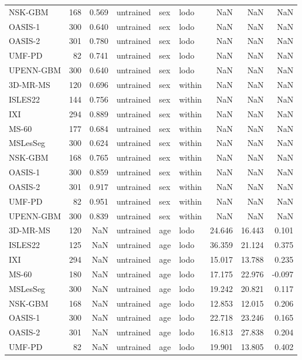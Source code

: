 \begin{tabular}{lrrlllrrr}
NSK-GBM & 168 & 0.569 & untrained & sex & lodo & NaN & NaN & NaN \\
OASIS-1 & 300 & 0.640 & untrained & sex & lodo & NaN & NaN & NaN \\
OASIS-2 & 301 & 0.780 & untrained & sex & lodo & NaN & NaN & NaN \\
UMF-PD & 82 & 0.741 & untrained & sex & lodo & NaN & NaN & NaN \\
UPENN-GBM & 300 & 0.640 & untrained & sex & lodo & NaN & NaN & NaN \\
3D-MR-MS & 120 & 0.696 & untrained & sex & within & NaN & NaN & NaN \\
ISLES22 & 144 & 0.756 & untrained & sex & within & NaN & NaN & NaN \\
IXI & 294 & 0.889 & untrained & sex & within & NaN & NaN & NaN \\
MS-60 & 177 & 0.684 & untrained & sex & within & NaN & NaN & NaN \\
MSLesSeg & 300 & 0.624 & untrained & sex & within & NaN & NaN & NaN \\
NSK-GBM & 168 & 0.765 & untrained & sex & within & NaN & NaN & NaN \\
OASIS-1 & 300 & 0.859 & untrained & sex & within & NaN & NaN & NaN \\
OASIS-2 & 301 & 0.917 & untrained & sex & within & NaN & NaN & NaN \\
UMF-PD & 82 & 0.951 & untrained & sex & within & NaN & NaN & NaN \\
UPENN-GBM & 300 & 0.839 & untrained & sex & within & NaN & NaN & NaN \\
3D-MR-MS & 120 & NaN & untrained & age & lodo & 24.646 & 16.443 & 0.101 \\
ISLES22 & 125 & NaN & untrained & age & lodo & 36.359 & 21.124 & 0.375 \\
IXI & 294 & NaN & untrained & age & lodo & 15.017 & 13.788 & 0.235 \\
MS-60 & 180 & NaN & untrained & age & lodo & 17.175 & 22.976 & -0.097 \\
MSLesSeg & 300 & NaN & untrained & age & lodo & 19.242 & 20.821 & 0.117 \\
NSK-GBM & 168 & NaN & untrained & age & lodo & 12.853 & 12.015 & 0.206 \\
OASIS-1 & 300 & NaN & untrained & age & lodo & 22.718 & 23.246 & 0.165 \\
OASIS-2 & 301 & NaN & untrained & age & lodo & 16.813 & 27.838 & 0.204 \\
UMF-PD & 82 & NaN & untrained & age & lodo & 19.901 & 13.805 & 0.402 \\

\end{tabular}
